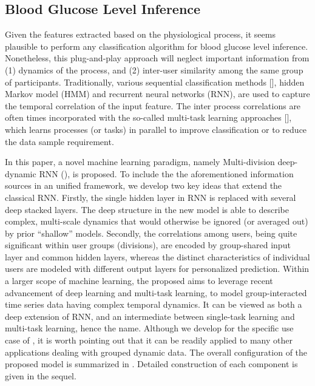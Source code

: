\subsection{Blood Glucose Level Inference}
Given the features extracted based on the physiological process, it seems plausible to perform any classification algorithm for blood glucose level inference.
Nonetheless, this plug-and-play approach will neglect important information from (1) dynamics of the process, and (2) inter-user similarity among the same group of participants.
Traditionally, various sequential classification methods [], \eg hidden Markov model (HMM) and recurrent neural networks (RNN), are used to capture the temporal correlation of the input feature.
The inter process correlations are often times incorporated with the so-called multi-task learning approaches [], which learns processes (or tasks) in parallel to improve classification or to reduce the data sample requirement.

In this paper, a novel machine learning paradigm, namely Multi-division deep-dynamic RNN (\modelname), is proposed.
To include the the aforementioned information sources in an unified framework, we develop two key ideas that extend the classical RNN. Firstly, the single hidden layer in RNN is replaced with several deep stacked layers.
The deep structure in the new model is able to describe complex, multi-scale dynamics that would otherwise be ignored (or averaged out) by prior ``shallow'' models.
Secondly, the correlations among users, being quite significant within user groups (divisions), are encoded by group-shared input layer and common hidden layers, whereas the distinct characteristics of individual users are modeled with different output layers for personalized prediction.
Within a larger scope of machine learning, the proposed \modelname aims to leverage recent advancement of deep learning and multi-task learning, to model group-interacted time series data having complex temporal dynamics.
It can be viewed as both a deep extension of RNN, and an intermediate between single-task learning and multi-task learning, hence the name.
Although we develop \modelname for the specific use case of \sysname, it is worth pointing out that it can be readily applied to many other applications dealing with grouped dynamic data. 
The overall configuration of the proposed model is summarized in .
Detailed construction of each component is given in the sequel.

